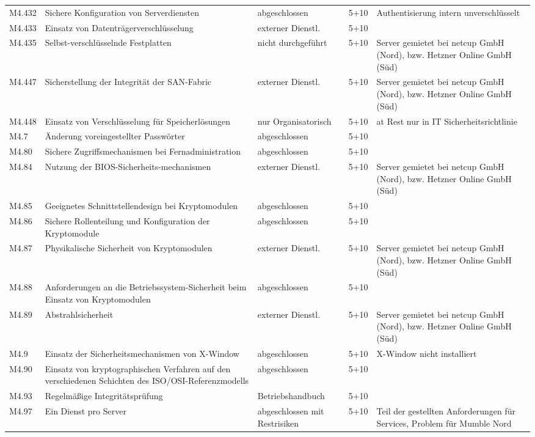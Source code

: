 \begin{longtable}{lp{3.7cm}|p{3cm}l|p{3.8cm}}
M4.432 & Sichere Konfiguration von Serverdiensten & abgeschlossen & 5+10 & Authentisierung intern unverschlüsselt \\
M4.433 & Einsatz von Datenträgerverschlüsselung & externer Dienstl. & 5+10 &  \\
M4.435 & Selbst-verschlüsselnde Festplatten & nicht durchgeführt & 5+10 & Server gemietet bei netcup GmbH (Nord), bzw. Hetzner Online GmbH (Süd) \\
M4.447 & Sicherstellung der Integrität der SAN-Fabric & externer Dienstl. & 5+10 & Server gemietet bei netcup GmbH (Nord), bzw. Hetzner Online GmbH (Süd) \\
M4.448 & Einsatz von Verschlüsselung für Speicherlösungen & nur Organisatorisch & 5+10 & at Rest nur in IT Sicherheitsrichtlinie \\
M4.7 & Änderung voreingestellter Passwörter & abgeschlossen & 5+10 &  \\
M4.80 & Sichere Zugriffsmechanismen bei Fernadministration & abgeschlossen & 5+10 &  \\
M4.84 & Nutzung der BIOS-Sicherheits-mechanismen & externer Dienstl. & 5+10 & Server gemietet bei netcup GmbH (Nord), bzw. Hetzner Online GmbH (Süd) \\
M4.85 & Geeignetes Schnittstellendesign bei Kryptomodulen & abgeschlossen & 5+10 &  \\
M4.86 & Sichere Rollenteilung und Konfiguration der Kryptomodule & abgeschlossen & 5+10 &  \\
M4.87 & Physikalische Sicherheit von Kryptomodulen & externer Dienstl. & 5+10 & Server gemietet bei netcup GmbH (Nord), bzw. Hetzner Online GmbH (Süd) \\
M4.88 & Anforderungen an die Betriebssystem-Sicherheit beim Einsatz von Kryptomodulen & abgeschlossen & 5+10 &  \\
M4.89 & Abstrahlsicherheit & externer Dienstl. & 5+10 & Server gemietet bei netcup GmbH (Nord), bzw. Hetzner Online GmbH (Süd) \\
M4.9 & Einsatz der Sicherheitsmechanismen von X-Window & abgeschlossen & 5+10 & X-Window nicht installiert \\
M4.90 & Einsatz von kryptographischen Verfahren auf den verschiedenen Schichten des ISO/OSI-Referenzmodells & abgeschlossen & 5+10 &  \\
M4.93 & Regelmäßige Integritätsprüfung & Betriebshandbuch & 5+10 &  \\
M4.97 & Ein Dienst pro Server & abgeschlossen mit Restrisiken & 5+10 & Teil der gestellten Anforderungen für Services, Problem für Mumble Nord \\

\end{longtable}
